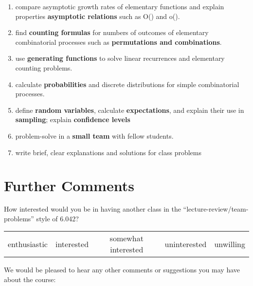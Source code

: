 \documentclass[handout]{mcs}
\begin{document}
\begin{enumerate}
\item \label{asymptotics} compare asymptotic growth rates of
  elementary functions and explain properties \textbf{asymptotic
    relations} such as O() and o().

\item \label{counting} find \textbf{counting formulas} for numbers of
  outcomes of elementary combinatorial processes such as
  \textbf{permutations and combinations}. \hfill \brule{0.5in}

\item\label{generating functions} use \textbf{generating functions} to solve
  linear recurrences and elementary counting problems.
  \hfill \brule{0.5in}

\item \label{probability} calculate \textbf{probabilities} and
  discrete distributions for simple combinatorial processes.  \hfill \brule{0.5in}

\item \label{random_variables} define \textbf{random variables},
  calculate \textbf{expectations}, and explain their use
  in \textbf{sampling}; explain \textbf{confidence levels} \hfill
  \brule{0.5in}

\item \label{student teams} problem-solve in a \textbf{small team} with
fellow students.  \hfill \brule{0.5in}

\item \label{writing} write brief, clear explanations and solutions for
  class problems \hfill \brule{0.5in}
\end{enumerate}

\newpage
\section*{Further Comments}

How interested would you be in having another class in the
``lecture-review/team-problems'' style of 6.042?
\begin{center}
\begin{tabular}{ccccc}
enthusiastic &  interested &  somewhat interested  &  uninterested &  unwilling
\end{tabular}
\end{center}

\vspace{0.5in}
We would be pleased to hear any other comments or suggestions you may have
about the course:

\textbox{\hspace{7in}
\vspace{6in}}
\end{document}
